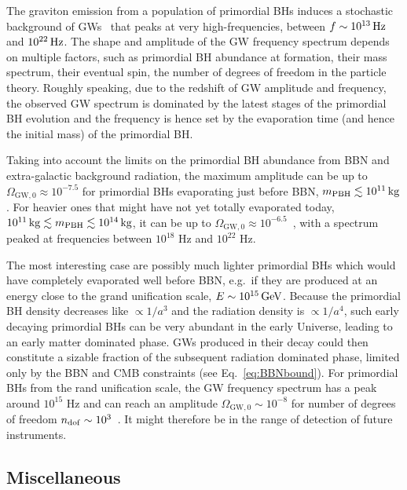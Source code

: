 \documentclass[11pt,a4paper]{article}
\begin{document}
The graviton emission from a population of primordial BHs induces a stochastic background of GWs~\cite{Anantua:2008am,Dong:2015yjs} that peaks at very high-frequencies, between $f\sim 10^{13} \, {\rm Hz}$ and $ 10^{22} \, {\rm Hz}$.
The shape and amplitude of the GW frequency spectrum depends on multiple factors, such as primordial BH abundance at formation, their mass spectrum, their eventual spin, the number of degrees of freedom in the particle theory. Roughly speaking, due to the redshift of GW amplitude and frequency, the observed GW spectrum is dominated by the latest stages of the primordial BH evolution and the frequency is hence set by the evaporation time (and hence the initial mass) of the primordial BH.

Taking into account the limits on the primordial BH abundance from BBN and extra-galactic background radiation, the maximum amplitude can be up to $\Omega_{\text{GW},0} \approx 10^{-7.5}$ for primordial BHs evaporating just before BBN, $m_{\rm PBH} \lesssim 10^{11} \, {\rm kg}$.  For heavier ones that might have not yet totally evaporated today, $10^{11} \, {\rm kg} \lesssim m_{\rm PBH} \lesssim 10^{14} \, {\rm kg}$, it can be up to $\Omega_{\text{GW},0} \approx 10^{-6.5}$~\cite{Dong:2015yjs}, with a spectrum peaked at frequencies between $10^{18}$ Hz and $10^{22}$ Hz.

The most interesting case are possibly much lighter primordial BHs which would have completely evaporated well before BBN, e.g.\ if they are produced at an energy close to the grand unification scale, $E \sim 10^{15} \, {\rm GeV}$. Because the primordial BH density decreases like $\propto 1/a^3$ and the radiation density is $\propto 1/a^4$, such early decaying primordial BHs can be very abundant in the early Universe, leading to an early matter dominated phase. GWs produced in their decay could then constitute a sizable fraction of the subsequent radiation dominated phase, limited only by the BBN and CMB constraints (see Eq.~\eqref{eq:BBNbound}). For primordial BHs from the rand unification scale, the GW frequency spectrum has a peak around $10^{15}$ Hz and can reach an amplitude $\Omega_{\text{GW},0} \sim 10^{-8}$ for number of degrees of freedom $n_{\rm dof}\sim 10^3$~\cite{Anantua:2008am}.  It might therefore be in the range of detection of future instruments.

\subsection{Miscellaneous}
\label{sec:Misc}
\end{document}
